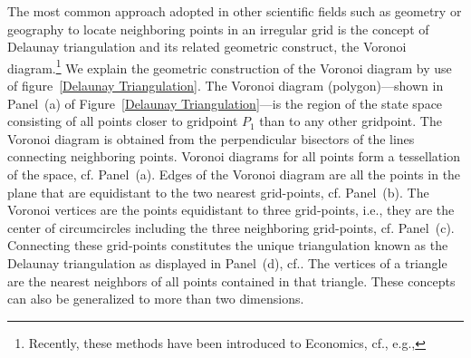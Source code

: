 \documentclass[a4paper,12pt]{article}%
\begin{document}
The most common approach adopted in other scientific fields such as geometry or geography to locate neighboring points in an irregular grid is the concept of Delaunay triangulation and its related geometric construct, the Voronoi diagram.\footnote{Recently, these methods have been introduced to Economics, cf., e.g., }
We explain the geometric construction of the Voronoi diagram by use of figure~\ref{Delaunay Triangulation}. The Voronoi diagram (polygon)---shown in Panel~(a) of Figure~\ref{Delaunay Triangulation}---is the region of the state space consisting of all points closer to gridpoint $P_{1}$ than to any other gridpoint. The Voronoi diagram is obtained from the perpendicular bisectors of the lines connecting neighboring points. Voronoi diagrams for all points form a tessellation of the space, cf. Panel~(a). Edges of the Voronoi diagram are all the points in the plane that are equidistant to the two nearest grid-points, cf. Panel~(b). The Voronoi vertices are the points equidistant to three grid-points, i.e., they are the center of circumcircles including the three neighboring grid-points, cf. Panel~(c). Connecting these grid-points constitutes the unique triangulation known as the Delaunay triangulation as displayed in Panel~(d), cf.. The vertices of a triangle are the nearest neighbors of all points contained in that triangle. These concepts can also be generalized to more than two dimensions.
\end{document}
